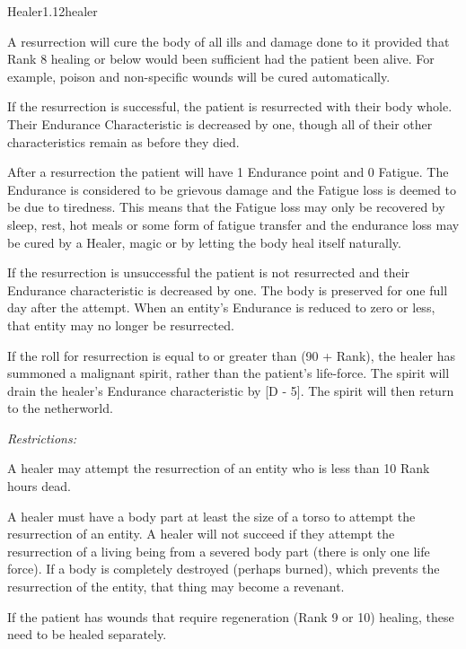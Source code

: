 \begin{skill*}{Healer}{1.12}{healer}
\begin{effects}
A resurrection will cure the body of all ills and damage done to it
provided that Rank 8 healing or below would been sufficient had the
patient been alive. For example, poison and non-specific wounds will
be cured automatically.

If the resurrection is successful, the patient is resurrected with
their body whole. Their Endurance Characteristic is decreased by one,
though all of their other characteristics remain as before they died.

After a resurrection the patient will have 1 Endurance point and 0
Fatigue. The Endurance is considered to be grievous damage and the
Fatigue loss is deemed to be due to tiredness. This means that the
Fatigue loss may only be recovered by sleep, rest, hot meals or some
form of fatigue transfer and the endurance loss may be cured by a
Healer, magic or by letting the body heal itself naturally.

If the resurrection is unsuccessful the patient is not resurrected and
their Endurance characteristic is decreased by one. The body is
preserved for one full day after the attempt. When an entity's
Endurance is reduced to zero or less, that entity may no longer be
resurrected.

If the roll for resurrection is equal to or greater than (90 + Rank),
the healer has summoned a malignant spirit, rather than the patient's
life-force.  The spirit will drain the healer's Endurance
characteristic by [D - 5]. The spirit will then return to the
netherworld.
\end{effects}

\smallskip
\emph{Restrictions:}
\begin{Enumerate}
\item
A healer may attempt the resurrection of an entity who is less than 10
\x Rank hours dead.

\item
A healer must have a body part at least the size of a torso to attempt
the resurrection of an entity. A healer will not succeed if they
attempt the resurrection of a living being from a severed body part
(there is only one life force). If a body is completely destroyed
(perhaps burned), which prevents the resurrection of the entity, that
thing may become a revenant.

\item
If the patient has wounds that require regeneration (Rank 9 or 10)
healing, these need to be healed separately.


\end{Enumerate}
\end{skill*}
